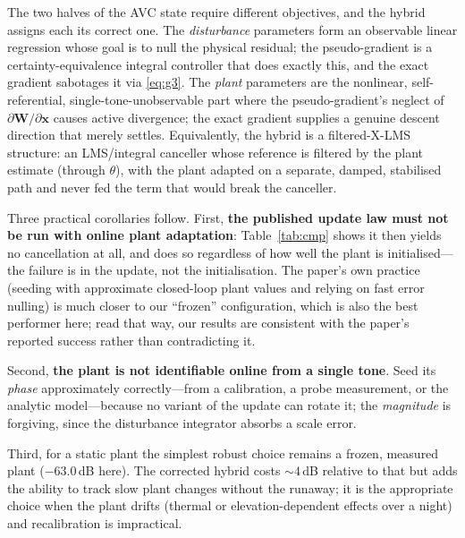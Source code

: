 \documentclass[11pt]{article}
\newcommand{\vx}{\mathbf{x}}
\newcommand{\vW}{\mathbf{W}}
\begin{document}
The two halves of the AVC state require different objectives, and the
hybrid assigns each its correct one. The \emph{disturbance} parameters form
an observable linear regression whose goal is to null the physical
residual; the pseudo-gradient is a certainty-equivalence integral
controller that does exactly this, and the exact gradient sabotages it via
\eqref{eq:g3}. The \emph{plant} parameters are the nonlinear,
self-referential, single-tone-unobservable part where the pseudo-gradient's
neglect of $\partial\vW/\partial\vx$ causes active divergence; the exact
gradient supplies a genuine descent direction that merely settles.
Equivalently, the hybrid is a filtered-X-LMS structure: an LMS/integral
canceller whose reference is filtered by the plant estimate (through
$\theta$), with the plant adapted on a separate, damped, stabilised path
and never fed the term that would break the canceller.

Three practical corollaries follow. First, \textbf{the published update law
must not be run with online plant adaptation}: Table~\ref{tab:cmp} shows it
then yields no cancellation at all, and does so regardless of how well the
plant is initialised---the failure is in the update, not the
initialisation. The paper's own practice (seeding with approximate
closed-loop plant values and relying on fast error nulling) is much closer
to our ``frozen'' configuration, which is also the best performer here;
read that way, our results are consistent with the paper's reported
success rather than contradicting it.

Second, \textbf{the plant is not identifiable online from a single tone}.
Seed its \emph{phase} approximately correctly---from a calibration, a probe
measurement, or the analytic model---because no variant of the update can
rotate it; the \emph{magnitude} is forgiving, since the disturbance
integrator absorbs a scale error.

Third, for a static plant the simplest robust choice remains a frozen,
measured plant ($-63.0$\,dB here). The corrected hybrid costs
${\sim}4$\,dB relative to that but adds the ability to track slow plant
changes without the runaway; it is the appropriate choice when the plant
drifts (thermal or elevation-dependent effects over a night) and
recalibration is impractical.
\end{document}
